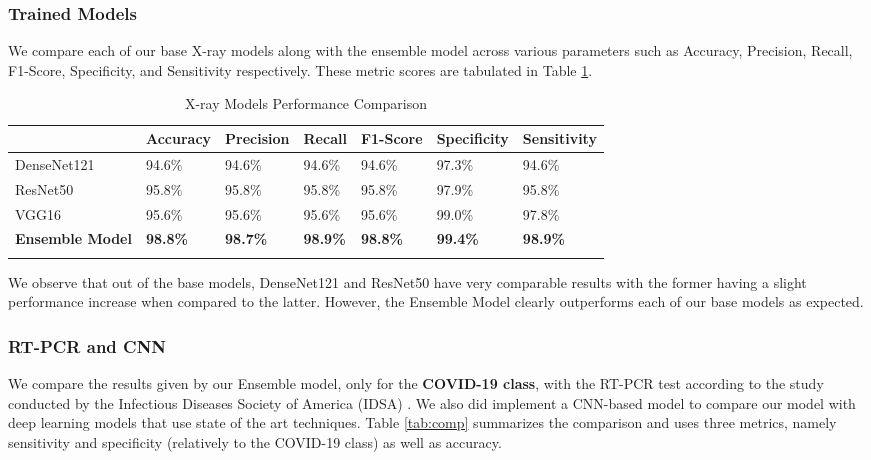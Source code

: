 \subsubsection{Trained Models}

We compare each of our base X-ray models along with the ensemble model across various parameters such as Accuracy, Precision, Recall, F1-Score, Specificity, and Sensitivity respectively. These metric scores are tabulated in Table \ref{tab:mpcXray}.

\vspace{1em}
 \begin{longtable}{| p{} |  p{} |   p{} | p{} | p{} | p{} | p{} |} 
    \hline
& \textbf{Accuracy} & \textbf{Precision} & \textbf{Recall} & \textbf{F1-Score} & \textbf{Specificity} & \textbf{Sensitivity} \\
\hline
			DenseNet121    &94.6\%   &94.6\%    &94.6\%    &94.6\%   &97.3\%   &94.6\% 
\\\hline
			ResNet50    &95.8\%   &95.8\%    &95.8\%    &95.8\%   &97.9\%   &95.8\% 
\\\hline
			VGG16    &95.6\%   &95.6\%    &95.6\%    &95.6\%   &99.0\%   &97.8\% 
\\\hline
	        \textbf{Ensemble Model}    &\textbf{98.8\%}   &\textbf{98.7\%}    &\textbf{98.9\%}    &\textbf{98.8\%}   &\textbf{99.4\%}   &\textbf{98.9\%} 
\\\hline
 \caption{X-ray Models Performance Comparison}  \label{tab:mpcXray}

    \end{longtable}
\vspace{-1em}
We observe that out of the base models, DenseNet121 and ResNet50 have very comparable results with the former having a slight performance increase when compared to the latter. However, the Ensemble Model clearly outperforms each of our base models as expected.

\subsubsection{RT-PCR and CNN}

We compare the results given by our Ensemble model, only for the \textbf{COVID-19 class}, with the RT-PCR test according to the study conducted by the Infectious Diseases Society of America (IDSA) \cite{IDS2020}. We also did implement a CNN-based model to compare our model with deep learning models that use state of the art techniques.
Table \ref{tab:comp} summarizes the comparison and uses three metrics, namely sensitivity and specificity (relatively to the COVID-19 class) as well as accuracy. 

